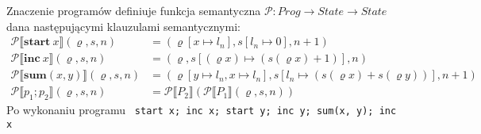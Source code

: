 \begin{problems}
    Znaczenie programów definiuje funkcja semantyczna $\mathcal{P} : Prog \to State \to State$ dana następującymi klauzulami semantycznymi:
    \begin{align*}
        \mathcal{P} \llbracket \textbf{start} \ x \rrbracket (\varrho, s, n) &= (\varrho[x \mapsto l_n], s[l_n \mapsto 0], n + 1) \\
        \mathcal{P} \llbracket \textbf{inc} \ x \rrbracket (\varrho, s, n) &= (\varrho, s[(\varrho x) \mapsto (s(\varrho x) + 1)], n) \\
        \mathcal{P} \llbracket \textbf{sum}(x, y) \rrbracket (\varrho, s, n) &= (\varrho[y \mapsto l_n, x \mapsto l_n], s[l_n \mapsto (s(\varrho x) + s(\varrho y))], n + 1) \\
        \mathcal{P} \llbracket p_1; p_2 \rrbracket (\varrho, s, n) &= \mathcal{P} \llbracket P_2 \rrbracket(\mathcal{P} \llbracket P_1 \rrbracket(\varrho, s, n))
    \end{align*}
    Po wykonaniu programu \texttt{
        start x;
        inc x;
        start y;
        inc y;
        sum(x, y);
        inc x
    }
\end{problems}

